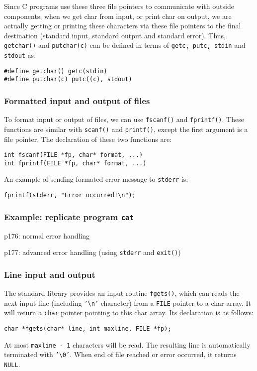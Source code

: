 \documentclass[12pt]{article}
\begin{document}
Since C programs use these three file pointers to communicate with outside components, when we get char from input, or print char on output, we are actually getting or printing these characters via these file pointers to the final destination (standard input, standard output and standard error). Thus, \texttt{getchar()} and \texttt{putchar(c)} can be defined in terms of \texttt{getc, putc, stdin} and \texttt{stdout} as:
\begin{verbatim}
#define getchar() getc(stdin)
#define putchar(c) putc((c), stdout)
\end{verbatim}

\subsubsection{Formatted input and output of files}
\label{sec:org7044ed8}
To format input or output of files, we can use \texttt{fscanf()} and \texttt{fprintf()}. These functions are similar with \texttt{scanf()} and \texttt{printf()}, except the first argument is a file pointer. The declaration of these two functions are:
\begin{verbatim}
int fscanf(FILE *fp, char* format, ...)
int fprintf(FILE *fp, char* format, ...)
\end{verbatim}

An example of sending formated error message to \texttt{stderr} is:
\begin{verbatim}
fprintf(stderr, "Error occurred!\n");
\end{verbatim}
\subsubsection{Example: replicate program \texttt{cat}}
\label{sec:org3b568dd}
p176: normal error handling

p177: advanced error handling (using \texttt{stderr} and \texttt{exit()})
\subsubsection{Line input and output}
\label{sec:orgd1531cb}
The standard library provides an input routine \texttt{fgets()}, which can reads the next input line (including \texttt{'\textbackslash{}n'} character) from a \texttt{FILE} pointer to a char array. It will return a \texttt{char} pointer pointing to this char array. Its declaration is as follows:
\begin{verbatim}
char *fgets(char* line, int maxline, FILE *fp);
\end{verbatim}
At most \texttt{maxline - 1} characters will be read. The resulting line is automatically terminated with \texttt{'\textbackslash{}0'}. When end of file reached or error occurred, it returns \texttt{NULL}.
\end{document}
